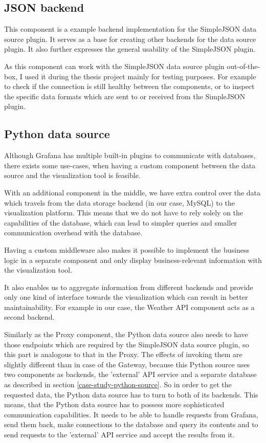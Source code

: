 \subsection{JSON backend}
This component is a example backend implementation for the SimpleJSON data source plugin. It serves as a base for creating other backends for the data source plugin. It also further expresses the general usability of the SimpleJSON plugin.

As this component can work with the SimpleJSON data source plugin out-of-the-box, I used it during the thesis project mainly for testing purposes. For example to check if the connection is still healthy between the components, or to inspect the specific data formats which are sent to or received from the SimpleJSON plugin.

\subsection{Python data source}

Although Grafana has multiple built-in plugins to communicate with databases, there exists some use-cases, when having a custom component between the data source and the visualization tool is feasible.

With an additional component in the middle, we have extra control over the data which travels from the data storage backend (in our case, MySQL) to the visualization platform. This means that we do not have to rely solely on the capabilities of the database, which can lead to simpler queries and smaller communication overhead with the database.

Having a custom middleware also makes it possible to implement the business logic in a separate component and only display business-relevant information with the visualization tool.

It also enables us to aggregate information from different backends and provide only one kind of interface towards the visualization which can result in better maintainability. For example in our case, the Weather API component acts as a second backend.

Similarly as the Proxy component, the Python data source also needs to have those endpoints which are required by the SimpleJSON data source plugin, so this part is analogous to that in the Proxy. The effects of invoking them are slightly different than in case of the Gateway, because this Python source uses two components as backends, the 'external' API service and a separate database as described in section \ref{case-study-python-source}. So in order to get the requested data, the Python data source has to turn to both of its backends. This means, that the Python data source has to possess more sophisticated communication capabilities. It needs to be able to handle requests from Grafana, send them back, make connections to the database and query its contents and to send requests to the 'external' API service and accept the results from it.

